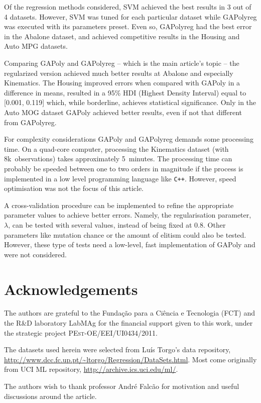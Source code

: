 \documentclass[preprint,authoryear,12pt]{elsarticle}
\begin{document}
Of the regression methods considered, \ac{SVM} achieved the best results in 3 out of 4 datasets. However, \ac{SVM} was tuned for each particular dataset while \ac{GAPolyreg} was executed with its parameters preset. Even so, \ac{GAPolyreg} had the best error in the Abalone dataset, and achieved competitive results in the Housing and Auto MPG datasets. 

Comparing \ac{GAPoly} and \ac{GAPolyreg} -- which is the main article's topic -- the regularized version achieved much better results at Abalone and especially Kinematics. The Housing improved errors when compared with \ac{GAPoly} in a difference in means, resulted in a 95\% HDI (Highest Density Interval) equal to [0.001, 0.119] which, while borderline, achieves statistical significance. Only in the Auto MOG dataset \ac{GAPoly} achieved better results, even if not that different from \ac{GAPolyreg}.

For complexity considerations \ac{GAPoly} and \ac{GAPolyreg} demands some processing time. On a quad-core computer, processing the Kinematics dataset (with 8k~observations) takes approximately 5~minutes. The processing time can probably be speeded between one to two orders in magnitude if the process is implemented in a low level programming language like \texttt{C++}. However, speed optimisation was not the focus of this article.

A cross-validation procedure can be implemented to refine the appropriate parameter values to achieve better errors. Namely, the regularisation parameter, $\lambda$, can be tested with several values, instead of being fixed at $0.8$. Other parameters like mutation chance or the amount of elitism could also be tested. However, these type of tests need a low-level, fast implementation of \ac{GAPoly} and were not considered.

\section*{Acknowledgements}

The authors are grateful to the Fundação para a Ciência e Tecnologia (FCT) and the  R\&D laboratory LabMAg for the financial support given to this work, under the strategic project \textsc{PEst-OE/EEI/UI0434/2011}.

The datasets used herein were selected from Luís Torgo's data  repository, \url{http://www.dcc.fc.up.pt/~ltorgo/Regression/DataSets.html}. Most come originally from UCI ML repository, \url{http://archive.ics.uci.edu/ml/}.

The authors wish to thank professor André Falcão for motivation and useful discussions around the article.




    
\end{document}
